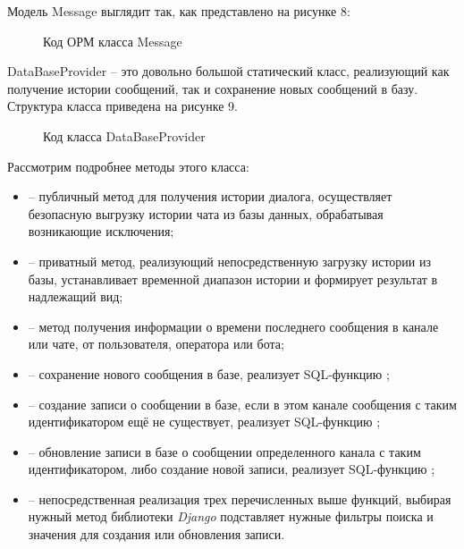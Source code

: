     \newpage
    Модель Message выглядит так, как представлено на рисунке 8:

    \begin{figure}[H]
        \centering
        
        \caption{Код ОРМ класса Message}
        \label{fig:message_model}
    \end{figure}

    DataBaseProvider -- это довольно большой статический класс, реализующий как получение истории сообщений,
    так и сохранение новых сообщений в базу.
    Структура класса приведена на рисунке 9.

    \begin{figure}[H]
        \centering
        
        \caption{Код класса DataBaseProvider}
        \label{fig:DataBaseProvider}
    \end{figure}

    Рассмотрим подробнее методы этого класса:
    \begin{itemize}
        \item {} -- публичный метод для получения истории диалога, осуществляет
        безопасную выгрузку истории чата из базы данных, обрабатывая возникающие исключения;
        \item {} -- приватный метод, реализующий непосредственную загрузку истории из базы,
        устанавливает временной диапазон истории и формирует результат в надлежащий вид;
        \item {} -- метод получения информации о времени последнего сообщения
        в канале или чате, от пользователя, оператора или бота;
        \item {} -- сохранение нового сообщения в базе, реализует SQL-функцию ;
        \item {} -- создание записи о сообщении в базе, если в этом канале сообщения с таким
        идентификатором ещё не существует, реализует SQL-функцию ;
        \item {} -- обновление записи в базе о сообщении определенного канала с таким
        идентификатором, либо создание новой записи, реализует SQL-функцию ;
        \item {} -- непосредственная реализация трех перечисленных выше функций,
        выбирая нужный метод библиотеки \textit{Django} подставляет нужные фильтры поиска и значения для создания
        или обновления записи.
    \end{itemize}

